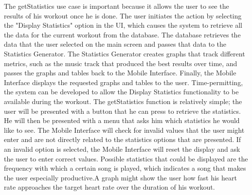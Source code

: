 \documentclass[letterpaper,english, 12pt]{scrreprt}
\begin{document}
The getStatistics use case is important because it allows the user to see the results of his workout once he is done. The user initiates the action by selecting the "Display Statistics" option in the UI, which causes the system to retrieve all the data for the current workout from the database. The database retrieves the data that the user selected on the main screen and passes that data to the Statistics Generator. The Statistics Generator creates graphs that track different metrics, such as the music track that produced the best results over time, and passes the graphs and tables back to the Mobile Interface. Finally, the Mobile Interface displays the requested graphs and tables to the user. Time-permitting, the system can be developed to allow the Display Statistics functionality to be available during the workout. The getStatistics function is relatively simple; the user will be presented with a button that he can press to retrieve the statistics. He will then be presented with a menu that asks him which statistics he would like to see. The Mobile Interface will check for invalid values that the user might enter and are not directly related to the statistics options that are presented. If an invalid option is selected, the Mobile Interface will reset the display and ask the user to enter correct values. Possible statistics that could be displayed are the frequency with which a certain song is played, which indicates a song that makes the user especially productive.A graph might show the user how fast his heart rate approaches the target heart rate over the duration of his workout.
\end{document}
